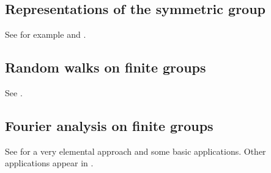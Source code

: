 \subsection*{Representations of the symmetric group}

See for example \cite[\S10]{MR2867444} and 
\cite{MR1153249}. 

\subsection*{Random walks on finite groups}

See \cite[\S11]{MR2867444}.

\subsection*{Fourier analysis on finite groups}

See \cite[\S5]{MR2867444} for a very elemental approach and some
basic applications. Other applications 
appear in \cite{MR1695775}.

